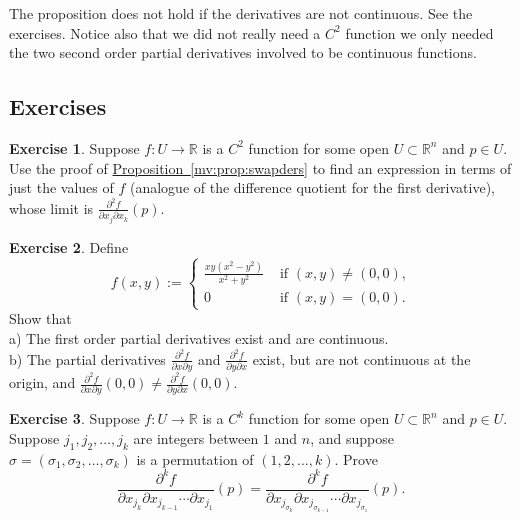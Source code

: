 \documentclass[12pt]{book}
\newcommand{\R}{{\mathbb{R}}}
\theoremstyle{plain}
\theoremstyle{remark}
\theoremstyle{definition}
\theoremstyle{exercise}
\newtheorem{exercise}{Exercise}[section]
\theoremstyle{example}
\newcommand{\propref}[1]{\hyperref[#1]{Proposition~\ref*{#1}}}
\begin{document}
The proposition does not hold if the derivatives are not
continuous.  See the exercises.
Notice also that we did not really need a $C^2$ function we only needed the
two second order partial derivatives involved to be continuous functions.

\subsection{Exercises}

\begin{exercise}
Suppose $f \colon U \to \R$ is a $C^2$ function for some open $U \subset
\R^n$ and $p \in U$.
Use the proof of \propref{mv:prop:swapders} to find an expression
in terms of just the values of $f$ (analogue of the difference quotient
for the first derivative), whose limit is
$\frac{\partial^2 f}{ \partial x_j \partial x_k}(p)$.
\end{exercise}

\begin{exercise}
Define
\begin{equation*}
f(x,y) :=
\begin{cases}
\frac{xy(x^2-y^2)}{x^2+y^2} & \text{ if $(x,y) \not= (0,0)$,}\\
0 & \text{ if $(x,y) = (0,0)$.}
\end{cases}
\end{equation*}
Show that\\
a) The first order partial derivatives exist and are continuous.\\
b) The partial derivatives
$\frac{\partial^2 f}{\partial x \partial y}$ and
$\frac{\partial^2 f}{\partial y \partial x}$ exist, but are not continuous
at the origin, and 
$\frac{\partial^2 f}{\partial x \partial y}(0,0) \not= 
\frac{\partial^2 f}{\partial y \partial x}(0,0)$.
\end{exercise}

\begin{exercise}
Suppose $f \colon U \to \R$ is a $C^k$ function for some open $U \subset
\R^n$ and $p \in U$.  Suppose $j_1,j_2,\ldots,j_k$ are integers between $1$
and $n$, and suppose $\sigma=(\sigma_1,\sigma_2,\ldots,\sigma_k)$ is a
permutation of $(1,2,\ldots,k)$.  Prove
\begin{equation*}
\frac{\partial^{k} f}{\partial x_{j_{k}} \partial x_{j_{k-1}}
\cdots \partial x_{j_1}} (p)
=
\frac{\partial^{k} f}{\partial x_{j_{\sigma_k}} \partial
x_{j_{\sigma_{k-1}}}
\cdots \partial x_{j_{\sigma_1}}} (p) .
\end{equation*}
\end{exercise}
\end{document}
